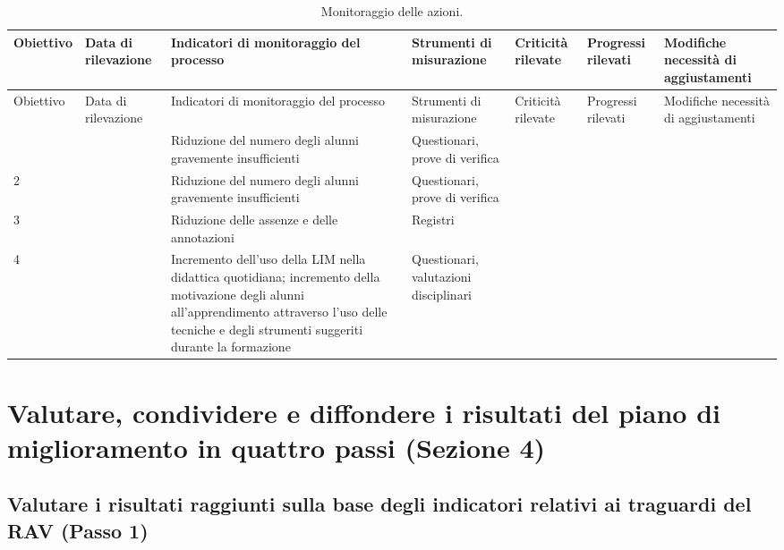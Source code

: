 \documentclass[12pt,a4paper,oneside]{memoir}
\begin{document}
\begin{footnotesize}
\begin{longtable}{|>{\raggedright}p{1.18cm}|>{\raggedright}p{1.45cm}|>{\raggedright}p{1.99cm}|>{\raggedright}p{1.55cm}|>{\raggedright}p{1.22cm}|>{\raggedright}p{1.27cm}|>{\raggedright\arraybackslash}p{1.74cm}|}
\caption{Monitoraggio delle azioni.}  \label{monitoraggio-azioni}\\
\hline
\rowcolor{violetto}
O\-biet\-ti\-vo&Data di ri\-le\-va\-zio\-ne&Indicatori di monitoraggio del processo&Stru\-men\-ti di misurazione&Cri\-ti\-ci\-tà rilevate&Pro\-gres\-si rilevati&Modifiche necessità di aggiustamenti\\\hline
\endfirsthead
\hline
\rowcolor{violetto}
O\-biet\-ti\-vo&Data di ri\-le\-va\-zio\-ne&Indicatori di monitoraggio del processo&Stru\-men\-ti di misurazione&Cri\-ti\-ci\-tà rilevate&Pro\-gres\-si rilevati&Modifiche necessità di aggiustamenti\\\hline
\endhead
\hline \multicolumn{7}{r}{\emph{Continua nella pagina successiva}}
\endfoot
\hline
\endlastfoot
1&&Riduzione del numero degli alunni gravemente insufficienti&Que\-stio\-na\-ri, prove di verifica&&&\\\hline
2&&Riduzione del numero degli alunni gravemente insufficienti&Que\-stio\-na\-ri, prove di verifica&&&\\\hline
3&&Riduzione delle assenze e delle annotazioni&Registri&&&\\\hline
4&&Incremento dell'uso della LIM nella didattica quotidiana; incremento della motivazione degli alunni all'apprendimento attraverso l'uso delle tecniche e degli strumenti suggeriti durante la formazione&Que\-stio\-na\-ri, valutazioni disciplinari&&&\\\hline
\end{longtable}
\end{footnotesize}



\section[Sezione 4. Valutare, condividere e diffondere]{Valutare, condividere e diffondere i risultati del piano di miglioramento in quattro passi (Sezione 4)}

\subsection[Passo 1. Valutare i risultati raggiunti]{Valutare i risultati raggiunti sulla base degli indicatori relativi ai traguardi del RAV (Passo 1)}
\end{document}
